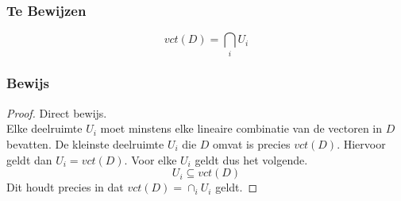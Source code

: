 \documentclass[lineaire_algebra_oplossingen.tex]{subfiles}
\begin{document}
\subsubsection*{Te Bewijzen}
\[
vct(D) = \bigcap_{i}U_i
\]
\subsubsection*{Bewijs}
\begin{proof}
Direct bewijs.\\
Elke deelruimte $U_i$ moet minstens elke lineaire combinatie van de vectoren in $D$ bevatten.
De kleinste deelruimte $U_i$ die $D$ omvat is precies $vct(D)$. Hiervoor geldt dan $U_i = vct(D)$.
Voor elke $U_i$ geldt dus het volgende.
\[
U_i \subseteq vct(D)
\]
Dit houdt precies in dat $vct(D) = \cap_iU_i$ geldt.
\end{proof}
\end{document}
